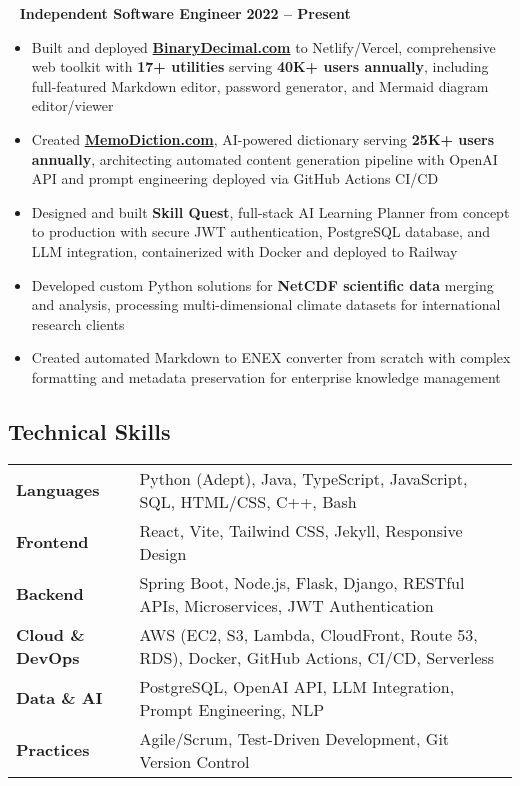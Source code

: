 \documentclass[11pt,letterpaper]{article}
\newcommand{\normalsizesection}{\normalsize}
\newcommand{\smallersection}{\small}
\newcommand{\sectionbox}[1]{%
    \vspace{0.1em}
    \begin{tcolorbox}[
        colback=sectionbg,
        colframe=sectionbg,
        width=\textwidth,
        left=5pt,
        right=5pt,
        top=2pt,
        bottom=2pt,
        boxrule=0pt,
        arc=0pt,
        boxsep=0pt,
    ]
    \section*{#1}
    \end{tcolorbox}
    \vspace{-0.4em}
}
\newcommand{\yearsright}[1]{{\footnotesize\bfseries\color{yearcolor} #1}}
\newenvironment{projectentry}{%
    \leftskip=0cm
    \par\noindent
}{\par\leftskip=0cm\vspace{-2pt}}
\newenvironment{projectdesc}{%
    \footnotesize
    \begin{itemize}[leftmargin=*, topsep=0pt, itemsep=0pt, parsep=0pt]
}{\end{itemize}\smallersection\vspace{-1pt}}
\newcommand{\projicon}[1]{%
    {\small\color{gray!70}#1}~%
}
\begin{document}
\begin{projectentry}
    \projicon{\faBriefcase} \textbf{Independent Software Engineer} \hfill \yearsright{2022 -- Present}
\end{projectentry}
\begin{projectdesc}
    \item Built and deployed \href{https://binarydecimal.com}{\textbf{BinaryDecimal.com}} to Netlify/Vercel, comprehensive web toolkit with \textbf{17+ utilities} serving \textbf{40K+ users annually}, including full-featured Markdown editor, password generator, and Mermaid diagram editor/viewer
    \item Created \href{https://memodiction.com}{\textbf{MemoDiction.com}}, AI-powered dictionary serving \textbf{25K+ users annually}, architecting automated content generation pipeline with OpenAI API and prompt engineering deployed via GitHub Actions CI/CD
    \item Designed and built \textbf{Skill Quest}, full-stack AI Learning Planner from concept to production with secure JWT authentication, PostgreSQL database, and LLM integration, containerized with Docker and deployed to Railway
    \item Developed custom Python solutions for \textbf{NetCDF scientific data} merging and analysis, processing multi-dimensional climate datasets for international research clients
    \item Created automated Markdown to ENEX converter from scratch with complex formatting and metadata preservation for enterprise knowledge management
\end{projectdesc}

\normalsizesection

\sectionbox{Technical Skills}
\smallersection

\begin{tabularx}{\textwidth}{@{} l X @{}}
\textbf{Languages} & Python (Adept), Java, TypeScript, JavaScript, SQL, HTML/CSS, C++, Bash \\[2pt]
\textbf{Frontend} & React, Vite, Tailwind CSS, Jekyll, Responsive Design \\[2pt]
\textbf{Backend} & Spring Boot, Node.js, Flask, Django, RESTful APIs, Microservices, JWT Authentication \\[2pt]
\textbf{Cloud \& DevOps} & AWS (EC2, S3, Lambda, CloudFront, Route 53, RDS), Docker, GitHub Actions, CI/CD, Serverless \\[2pt]
\textbf{Data \& AI} & PostgreSQL, OpenAI API, LLM Integration, Prompt Engineering, NLP \\[2pt]
\textbf{Practices} & Agile/Scrum, Test-Driven Development, Git Version Control
\end{tabularx}
\end{document}
